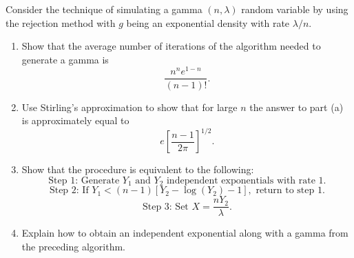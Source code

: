 \setcounter{exercise}{7}
\begin{exercise}
\label{ex:simulation-8}
Consider the technique of simulating a gamma $(n,\lambda)$ random variable by using the rejection method with $g$ being an exponential density with rate $\lambda/n$.
\begin{enumerate}
\item Show that the average number of iterations of the algorithm needed to generate a gamma is
\[
\frac{n^n e^{1-n}}{(n-1)!}.
\]
\item Use Stirling's approximation to show that for large $n$ the answer to part (a) is approximately equal to
\[
e\left[\frac{n-1}{2\pi}\right]^{1/2}.
\]
\item Show that the procedure is equivalent to the following:
\[
\text{Step 1: Generate }Y_1\text{ and }Y_2\text{ independent exponentials with rate }1.
\]
\[
\text{Step 2: If }Y_1<(n-1)[Y_2-\log(Y_2)-1],\text{ return to step 1.}
\]
\[
\text{Step 3: Set }X=\frac{nY_2}{\lambda}.
\]
\item Explain how to obtain an independent exponential along with a gamma from the preceding algorithm.
\end{enumerate}
\end{exercise}

